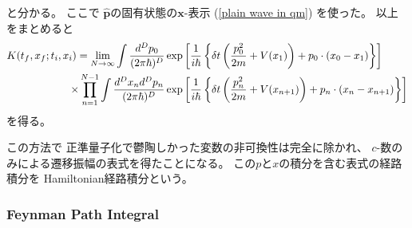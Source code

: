 と分かる。
ここで
$\hat{\bm{p}}$の固有状態の$\bm{x}$-表示
(\ref{plain wave in qm})
を使った。
以上をまとめると
\begin{align}
    K( t_f, x_f ; t_i, x_i )
    =
    \lim_{ N \to \infty }
        \int
        \dfrac{ d^D p_0 }{ (2 \pi \hbar)^{D} }
    &
    \exp\left[
        \dfrac{ 1 }{i\hbar}
        \left\{
            \delta t
            \left(
                \dfrac{ p^2_0 }{ 2m }
            +
                V( x_{1} )
            \right)
            +
            p_0 \cdot
            \left(
                x_{0}
                -
                x_{1}
            \right)
        \right\}
    \right]
\notag\\\times
    \prod_{n=1}^{N-1}
    \int
    \dfrac{ d^D x_n d^D p_n }{ (2 \pi \hbar)^{D} }
    &
    \exp\left[
        \dfrac{ 1 }{i\hbar}
        \left\{
            \delta t
            \left(
                \dfrac{ p^2_n }{ 2m }
            +
                V( x_{n+1} )
            \right)
            +
            p_n \cdot
            \left(
                x_{n}
                -
                x_{n+1}
            \right)
        \right\}
    \right]
\end{align}
を得る。

この方法で
正準量子化で鬱陶しかった変数の非可換性は完全に除かれ、
$c$-数のみによる遷移振幅の表式を得たことになる。
この$p$と$x$の積分を含む表式の経路積分を
Hamiltonian経路積分という。

\subsubsection{Feynman Path Integral}

